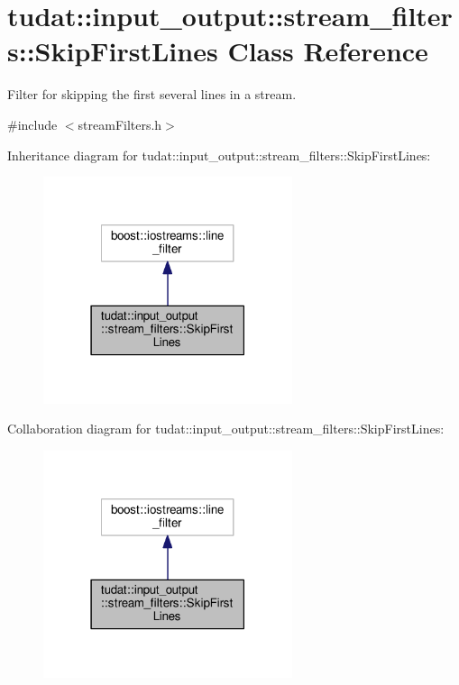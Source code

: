 \hypertarget{classtudat_1_1input__output_1_1stream__filters_1_1SkipFirstLines}{}\section{tudat\+:\+:input\+\_\+output\+:\+:stream\+\_\+filters\+:\+:Skip\+First\+Lines Class Reference}
\label{classtudat_1_1input__output_1_1stream__filters_1_1SkipFirstLines}


Filter for skipping the first several lines in a stream.  




{\ttfamily \#include $<$stream\+Filters.\+h$>$}



Inheritance diagram for tudat\+:\+:input\+\_\+output\+:\+:stream\+\_\+filters\+:\+:Skip\+First\+Lines\+:
\nopagebreak
\begin{figure}[H]
\begin{center}
\leavevmode
\includegraphics[width=207pt]{classtudat_1_1input__output_1_1stream__filters_1_1SkipFirstLines__inherit__graph}
\end{center}
\end{figure}


Collaboration diagram for tudat\+:\+:input\+\_\+output\+:\+:stream\+\_\+filters\+:\+:Skip\+First\+Lines\+:
\nopagebreak
\begin{figure}[H]
\begin{center}
\leavevmode
\includegraphics[width=207pt]{classtudat_1_1input__output_1_1stream__filters_1_1SkipFirstLines__coll__graph}
\end{center}
\end{figure}
